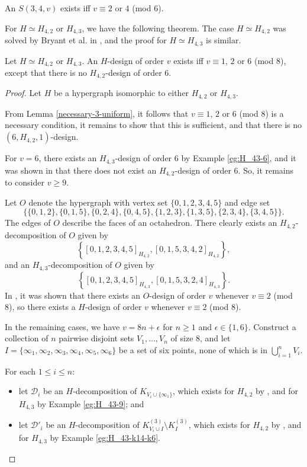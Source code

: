 \begin{theorem} \label{thm:K4^3}
An $S(3, 4, v)$ exists iff $v \equiv 2$ or $4$ (mod $6$).
\end{theorem}


For $H \simeq H_{4,2}$ or $H_{4,3}$, we have the following theorem.
The case $H \simeq H_{4,2}$ was solved by Bryant et al. in \cite{bryant}, and the proof for $H \simeq H_{4,3}$ is similar.

\begin{theorem} \label{thm:H_42,H_43}
Let $H \simeq H_{4,2}$ or $H_{4,3}$.
An $H$-design of order $v$ exists iff $v \equiv 1$, $2$ or $6$ (mod $8$),
  except that there is no $H_{4,2}$-design of order $6$.
\end{theorem}

\begin{proof}
Let $H$ be a hypergraph isomorphic to either $H_{4,2}$ or $H_{4,3}$.

From Lemma \ref{necessary-3-uniform}, it follows that $v \equiv 1$, $2$ or $6$ (mod $8$) is a necessary condition,
   it remains to show that this is sufficient, and that there is no $(6, H_{4,2}, 1)$-design.

For $v = 6$, there exists an $H_{4,3}$-design of order 6 by Example \ref{eg:H_43-6},
  and it was shown in \cite{bryant} that there does not exist an $H_{4,2}$-design of order 6. So, it remains to consider $v \geq 9$.

Let $O$ denote the hypergraph with vertex set $\{0,1,2,3,4,5\}$ and edge set
\[
    \{\{0,1,2\},\{0,1,5\},\{0,2,4\},\{0,4,5\},\{1,2,3\},\{1,3,5\},\{2,3,4\},\{3,4,5\}\}.
\]
The edges of $O$ describe the faces of an octahedron.
There clearly exists an $H_{4,2}$-decomposition of $O$ given by \[ \left\{ [0,1,2,3,4,5]_{H_{4,2}}, [0,1,5,3,4,2]_{H_{4,2}} \right\}, \]
  and an $H_{4,3}$-decomposition of $O$ given by \[ \left\{[0,1,2,3,4,5]_{H_{4,3}}, [0,1,5,3,2,4]_{H_{4,3}} \right\}. \]
In \cite{hanani}, it was shown that there exists an $O$-design of order $v$ whenever $v \equiv 2$ (mod 8),
  so there exists a $H$-design of order $v$ whenever $v \equiv 2$ (mod 8).


In the remaining cases, we have $v = 8n + \epsilon$ for $n \geq 1$ and $\epsilon \in \{1,6\}$.
Construct a collection of $n$ pairwise disjoint sets $V_1, \ldots, V_n$ of size 8,
  and let $I = \{\infty_1, \infty_2, \infty_3, \infty_4, \infty_5, \infty_6\}$ be a set of six points, none of which is in $\bigcup_{i=1}^{n} V_i$.

For each $1 \leq i \leq n$:
\begin{itemize}
  \item let $\mathcal{D}_i$ be an $H$-decomposition of $K_{V_i \cup \{\infty_1\}}$, which exists for $H_{4,2}$ by \cite{bryant}, and for $H_{4,3}$ by Example \ref{eg:H_43-9}; and
  \item let $\mathcal{D}'_i$ be an $H$-decomposition of $K_{V_i \cup I}^{(3)} \setminus K_{I}^{(3)}$, which exists for $H_{4,2}$ by \cite{bryant}, and for $H_{4,3}$ by Example \ref{eg:H_43-k14-k6}.
\end{itemize}


\end{proof}
